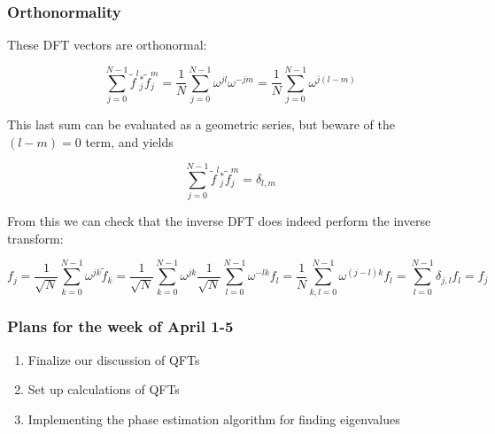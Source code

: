 \documentclass{beamer}
\begin{document}
\begin{frame}
\frametitle{Orthonormality}

These DFT vectors are orthonormal:

\begin{equation*}
\sum_{j=0}^{N-1} \tilde{f}^{l}{ }_{j}^{*} \tilde{f}_{j}^{m}=\frac{1}{N} \sum_{j=0}^{N-1} \omega^{j l} \omega^{-j m}=\frac{1}{N} \sum_{j=0}^{N-1} \omega^{j(l-m)} 
\end{equation*}

This last sum can be evaluated as a geometric series, but beware of the $(l-m)=0$ term, and yields

\begin{equation*}
\sum_{j=0}^{N-1} \tilde{f}^{l}{ }_{j}^{*} \tilde{f}_{j}^{m}=\delta_{l, m}
\end{equation*}

From this we can check that the inverse DFT does indeed perform the inverse transform:

\begin{equation*}
f_{j}=\frac{1}{\sqrt{N}} \sum_{k=0}^{N-1} \omega^{j k} \tilde{f}_{k}=\frac{1}{\sqrt{N}} \sum_{k=0}^{N-1} \omega^{j k} \frac{1}{\sqrt{N}} \sum_{l=0}^{N-1} \omega^{-l k} f_{l}=\frac{1}{N} \sum_{k, l=0}^{N-1} \omega^{(j-l) k} f_{l}=\sum_{l=0}^{N-1} \delta_{j, l} f_{l}=f_{j} 
\end{equation*}
\end{frame}

\begin{frame}
\frametitle{Plans for the week of April 1-5}

\begin{enumerate}
\item Finalize our discussion of QFTs

\item Set up calculations of QFTs

\item Implementing the phase estimation algorithm for finding eigenvalues
\end{enumerate}

\noindent
\end{frame}
\end{document}
